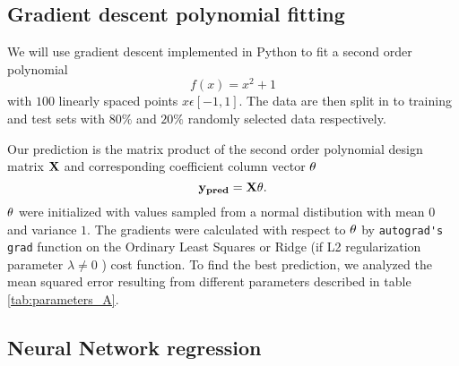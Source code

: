 \subsection{Gradient descent polynomial fitting}
We will use gradient descent implemented in Python to fit a second order polynomial 
\begin{equation}
f(x)=x^{2}+1
\label{eq:polynomial_A}
\end{equation}
with \(100\) linearly spaced points \(x\epsilon [-1, 1]\). The data are then 
split in to training and test sets with \(80\%\) and \(20\%\) randomly selected 
data respectively. 

Our prediction is the matrix product of the second order polynomial design matrix 
\(\bf{X}\) and corresponding coefficient column vector \(\bf{\theta }\)
\begin{equation}
	\bf{y _{pred}} = \bf{X}\bf{\theta}.
	\label{eq:y_pred}
\end{equation}
\(\bf{\theta }\) were initialized with values sampled from a normal distibution with 
mean \(0\) and variance \(1\).   
The gradients were calculated with respect to 
\(\bf{\theta }\) by \verb|autograd's| \verb|grad| function on 
the Ordinary Least Squares or Ridge (if L2 regularization parameter \(\lambda \neq 0 \) ) cost function. 
To find the best prediction, we analyzed the mean squared error resulting from different 
parameters described in table \ref{tab:parameters_A}.



\subsection{Neural Network regression}
